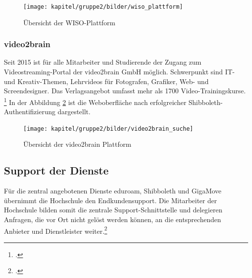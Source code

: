 \begin{figure}[h]
	\centering
	\texttt{[image: kapitel/gruppe2/bilder/wiso\_plattform]}
	\caption{Übersicht der WISO-Plattform \protect\footnotemark}
	\label{fig_wiso_plattform}
\end{figure}
\newpage
\subsubsection{video2brain}
Seit 2015 ist für alle Mitarbeiter und Studierende der Zugang zum Videostreaming-Portal der video2brain GmbH möglich. Schwerpunkt sind IT- und Kreativ-Themen, Lehrvideos für Fotografen, Grafiker, Web- und Screendesigner. Das Verlagsangebot umfasst mehr als 1700 Video-Trainingskurse. \footcite{adsgmbh_video2brain_2013} In der Abbildung \ref{fig_video2brain_suchergebnis} ist die Weboberfläche nach erfolgreicher Shibboleth-Authentifizierung dargestellt.

\begin{figure}[h]
	\centering
	\texttt{[image: kapitel/gruppe2/bilder/video2brain\_suche]}
	\caption{Übersicht der video2brain Plattform \protect\footnotemark}
	\label{fig_video2brain_suchergebnis}
\end{figure}

\subsection{Support der Dienste}
Für die zentral angebotenen Dienste eduroam, Shibboleth und GigaMove übernimmt die Hochschule den Endkundensupport. Die Mitarbeiter der Hochschule bilden somit die zentrale Support-Schnittstelle und delegieren Anfragen, die vor Ort nicht gelöst werden können, an die entsprechenden Anbieter und Dienstleister weiter.\footcite{gunter_muller_interview}